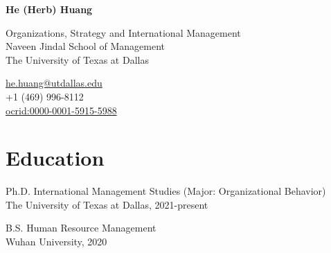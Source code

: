 \documentclass[12pt,letterpaper]{report} %
\newcommand{\myname}{He (Herb) Huang}
\newcommand{\namefont}[1]{{\normalfont\bfseries\Large{#1}}}
\begin{document}
    \raggedright{}

    \begin{center}\namefont{\myname}\end{center}

    \vspace{1em}
    \begin{minipage}[t]{0.700\textwidth}
        Organizations, Strategy and International Management \\
        Naveen Jindal School of Management \\
        The University of Texas at Dallas
    \end{minipage}
    \begin{minipage}[t]{0.295\textwidth}
        \flushright{}
        \href{mailto:he.huang@utdallas.edu}{he.huang@utdallas.edu} \\
        +1 (469) 996-8112 \\
        \href{https://orcid.org/0000-0001-5915-5988}{ocrid:0000-0001-5915-5988}
    \end{minipage}


    \section*{Education}

    \begin{tablist}

        \item[Ph.D.]\tab{}International Management Studies (Major: Organizational Behavior) \\The University of Texas at Dallas, 2021-present
        \item[B.S.] \tab{}Human Resource Management\\Wuhan University, 2020

    \end{tablist}





\end{document}
